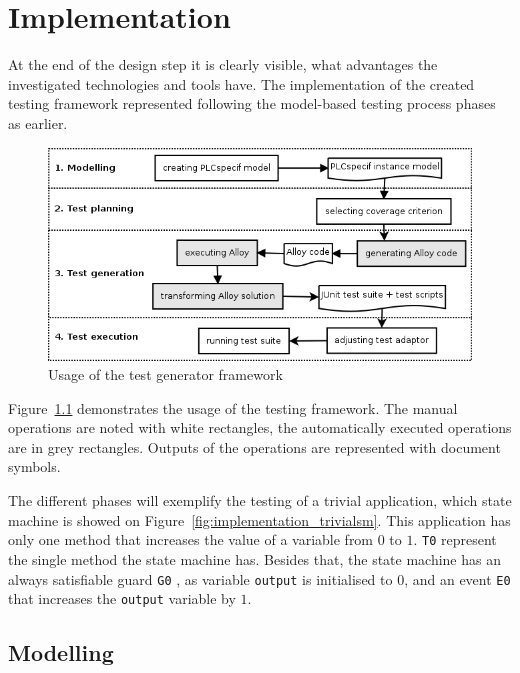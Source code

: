 \chapter{Implementation}
\label{cha:implementation}

At the end of the design step it is clearly visible, what advantages the investigated technologies and tools have. The implementation of the created testing framework represented following the model-based testing process phases as earlier.

\begin{figure}[htp]
\centering
\includegraphics[scale=0.6]{figures/implementation_usage}
\caption{Usage of the test generator framework}
\label{fig:implementation_usage}
\end{figure}

Figure~\ref{fig:implementation_usage} demonstrates the usage of the testing framework. The manual operations are noted with white rectangles, the automatically executed operations are in grey rectangles. Outputs of the operations are represented with document symbols.

The different phases will exemplify the testing of a trivial application, which state machine is showed on Figure~\ref{fig:implementation_trivialsm}. This application has only one method that increases the value of a variable from $0$ to $1$. \texttt{T0} represent the single method the state machine has. Besides that, the state machine has an always satisfiable guard \texttt{G0} , as variable \texttt{output} is initialised to $0$, and an event \texttt{E0} that increases the \texttt{output} variable by $1$. 

\section{Modelling}
\label{sec:implementationmodelling}

